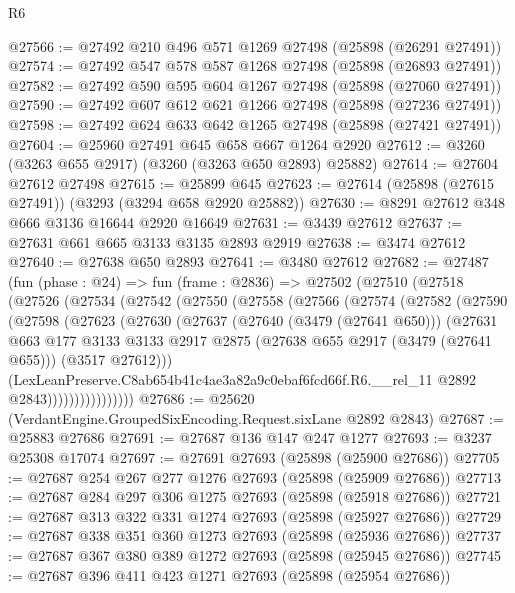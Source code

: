 \begin{lexlean}{R6}
\begin{coremodule}
@27566 := @27492 @210 @496 @571 @1269 @27498 (@25898 (@26291 @27491))
@27574 := @27492 @547 @578 @587 @1268 @27498 (@25898 (@26893 @27491))
@27582 := @27492 @590 @595 @604 @1267 @27498 (@25898 (@27060 @27491))
@27590 := @27492 @607 @612 @621 @1266 @27498 (@25898 (@27236 @27491))
@27598 := @27492 @624 @633 @642 @1265 @27498 (@25898 (@27421 @27491))
@27604 := @25960 @27491 @645 @658 @667 @1264 @2920
@27612 := @3260 (@3263 @655 @2917) (@3260 (@3263 @650 @2893) @25882)
@27614 := @27604 @27612 @27498
@27615 := @25899 @645
@27623 := @27614 (@25898 (@27615 @27491)) (@3293 (@3294 @658 @2920 @25882))
@27630 := @8291 @27612 @348 @666 @3136 @16644 @2920 @16649
@27631 := @3439 @27612
@27637 := @27631 @661 @665 @3133 @3135 @2893 @2919
@27638 := @3474 @27612
@27640 := @27638 @650 @2893
@27641 := @3480 @27612
@27682 := @27487
    (fun (phase : @24) =>
    fun (frame : @2836) =>
    @27502
      (@27510
        (@27518
          (@27526
            (@27534
              (@27542
                (@27550
                  (@27558
                    (@27566
                      (@27574
                        (@27582
                          (@27590
                            (@27598
                              (@27623
                                (@27630
                                  (@27637
                                    (@27640 (@3479 (@27641 @650)))
                                    (@27631
                                      @663
                                      @177
                                      @3133
                                      @3133
                                      @2917
                                      @2875
                                      (@27638 @655 @2917 (@3479 (@27641 @655)))
                                      (@3517 @27612)))
                                  (LexLeanPreserve.C8ab654b41c4ae3a82a9c0ebaf6fcd66f.R6.__rel_11
                                    @2892
                                    @2843))))))))))))))))
@27686 := @25620 (VerdantEngine.GroupedSixEncoding.Request.sixLane @2892 @2843)
@27687 := @25883 @27686
@27691 := @27687 @136 @147 @247 @1277
@27693 := @3237 @25308 @17074
@27697 := @27691 @27693 (@25898 (@25900 @27686))
@27705 := @27687 @254 @267 @277 @1276 @27693 (@25898 (@25909 @27686))
@27713 := @27687 @284 @297 @306 @1275 @27693 (@25898 (@25918 @27686))
@27721 := @27687 @313 @322 @331 @1274 @27693 (@25898 (@25927 @27686))
@27729 := @27687 @338 @351 @360 @1273 @27693 (@25898 (@25936 @27686))
@27737 := @27687 @367 @380 @389 @1272 @27693 (@25898 (@25945 @27686))
@27745 := @27687 @396 @411 @423 @1271 @27693 (@25898 (@25954 @27686))

\end{coremodule}
\end{lexlean}
